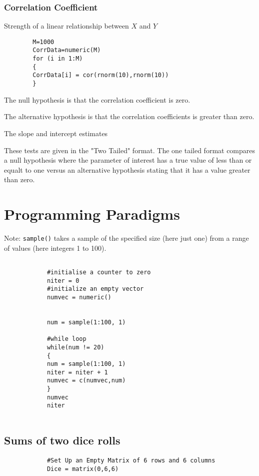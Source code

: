 \documentclass[a4paper,12pt]{article}
\begin{document}
\begin{itemize}
\begin{itemize}
		\subsubsection{Correlation Coefficient}
		Strength of a linear relationship between $X$ and $Y$
		
		\begin{verbatim}
		M=1000
		CorrData=numeric(M)
		for (i in 1:M)
		{
		CorrData[i] = cor(rnorm(10),rnorm(10))
		}
		\end{verbatim}
		The null hypothesis is that the correlation coefficient is zero. 
		
		The alternative hypothesis is that the correlation coefficients is greater than zero. 
		
		The slope and intercept estimates 
		
		These tests are given in the "Two Tailed" format. 
		The one tailed format compares a null hypothesis where the parameter of interest has a true value of less than or equalt to one versus an alternative hypothesis stating that it has a value greater than zero. 
		
		
		
		\newpage
		\section{Programming Paradigms}

		
		
		Note: \texttt{sample()} takes a sample of the specified size (here just one) from a range of values (here integers 1 to 100).
		\begin{framed}
			\begin{verbatim}
			
			#initialise a counter to zero
			niter = 0		
			#initialize an empty vector
			numvec = numeric()
			
			
			num = sample(1:100, 1)
			
			#while loop
			while(num != 20)
			{
			num = sample(1:100, 1)
			niter = niter + 1
			numvec = c(numvec,num)
			}
			numvec
			niter
			
			\end{verbatim}
		\end{framed}
		
		
		\subsection{Sums of two dice rolls}
		\begin{framed}
			\begin{verbatim}
			#Set Up an Empty Matrix of 6 rows and 6 columns
			Dice = matrix(0,6,6)
			

\end{verbatim}
\end{framed}
\end{itemize}
\end{itemize}
\end{document}
